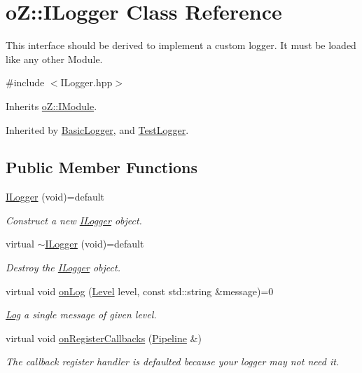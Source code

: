 \hypertarget{classo_z_1_1_i_logger}{}\section{oZ\+::I\+Logger Class Reference}
\label{classo_z_1_1_i_logger}


This interface should be derived to implement a custom logger. It must be loaded like any other Module.  




{\ttfamily \#include $<$I\+Logger.\+hpp$>$}



Inherits \mbox{\hyperlink{classo_z_1_1_i_module}{o\+Z\+::\+I\+Module}}.



Inherited by \mbox{\hyperlink{class_basic_logger}{Basic\+Logger}}, and \mbox{\hyperlink{class_test_logger}{Test\+Logger}}.

\subsection*{Public Member Functions}
\begin{DoxyCompactItemize}
\item 
\mbox{\hyperlink{classo_z_1_1_i_logger_a1ef3d8ab6931286af8f13e161520544b}{I\+Logger}} (void)=default
\begin{DoxyCompactList}\small\item\em Construct a new \mbox{\hyperlink{classo_z_1_1_i_logger}{I\+Logger}} object. \end{DoxyCompactList}\item 
virtual \mbox{\hyperlink{classo_z_1_1_i_logger_a5a6f9c60dcd37b014a3621ed39ef6ba6}{$\sim$\+I\+Logger}} (void)=default
\begin{DoxyCompactList}\small\item\em Destroy the \mbox{\hyperlink{classo_z_1_1_i_logger}{I\+Logger}} object. \end{DoxyCompactList}\item 
virtual void \mbox{\hyperlink{classo_z_1_1_i_logger_a2e0e168c9218055e41bdd5b57177cba1}{on\+Log}} (\mbox{\hyperlink{namespaceo_z_a72fc7662d5f07391ac6f0a5699014bfa}{Level}} level, const std\+::string \&message)=0
\begin{DoxyCompactList}\small\item\em \mbox{\hyperlink{classo_z_1_1_log}{Log}} a single message of given level. \end{DoxyCompactList}\item 
virtual void \mbox{\hyperlink{classo_z_1_1_i_logger_a10732b6da6e8f085c6fe5fa154d361ef}{on\+Register\+Callbacks}} (\mbox{\hyperlink{classo_z_1_1_pipeline}{Pipeline}} \&)
\begin{DoxyCompactList}\small\item\em The callback register handler is defaulted because your logger may not need it. \end{DoxyCompactList}\end{DoxyCompactItemize}
